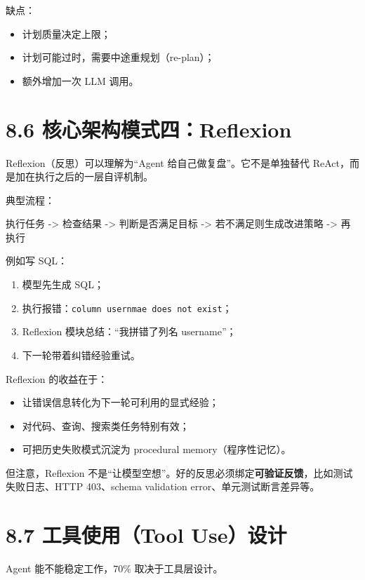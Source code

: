 缺点：


\begin{itemize}[leftmargin=2em]
\item 计划质量决定上限；
\item 计划可能过时，需要中途重规划（re-plan）；
\item 额外增加一次 LLM 调用。
\end{itemize}

\section{8.6 核心架构模式四：Reflexion}

Reflexion（反思）可以理解为``Agent 给自己做复盘''。它不是单独替代 ReAct，而是加在执行之后的一层自评机制。


典型流程：


\begin{codeblock}
执行任务 -> 检查结果 -> 判断是否满足目标 -> 若不满足则生成改进策略 -> 再执行
\end{codeblock}

例如写 SQL：


\begin{enumerate}[leftmargin=2em]
\item 模型先生成 SQL；
\item 执行报错：\texttt{column usernmae does not exist}；
\item Reflexion 模块总结：``我拼错了列名 username''；
\item 下一轮带着纠错经验重试。
\end{enumerate}

Reflexion 的收益在于：


\begin{itemize}[leftmargin=2em]
\item 让错误信息转化为下一轮可利用的显式经验；
\item 对代码、查询、搜索类任务特别有效；
\item 可把历史失败模式沉淀为 procedural memory（程序性记忆）。
\end{itemize}

但注意，Reflexion 不是``让模型空想''。好的反思必须绑定\textbf{可验证反馈}，比如测试失败日志、HTTP 403、schema validation error、单元测试断言差异等。


\section{8.7 工具使用（Tool Use）设计}

Agent 能不能稳定工作，70\% 取决于工具层设计。


